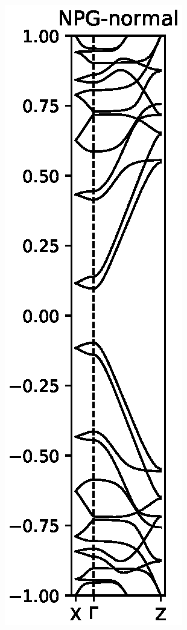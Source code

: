 \begin{figure}
    \centering
    \begin{subfigure}[b]{0.3\textwidth}
        \includegraphics[width=\textwidth]{Figures/FabNPGBS.eps}

\end{subfigure}
\end{figure}
